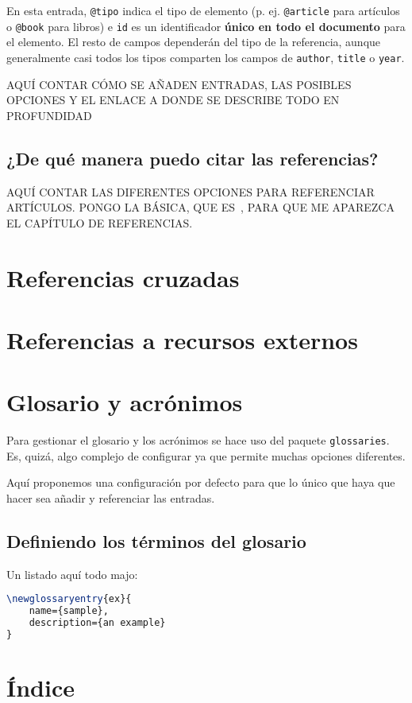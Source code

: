 En esta entrada, \texttt{@tipo} indica el tipo de elemento (p. ej. \texttt{@article} para artículos o \texttt{@book} para libros) e \texttt{id} es un identificador \textbf{único en todo el documento} para el elemento. El resto de campos dependerán del tipo de la referencia, aunque generalmente casi todos los tipos comparten los campos de \texttt{author}, \texttt{title} o \texttt{year}.

AQUÍ CONTAR CÓMO SE AÑADEN ENTRADAS, LAS POSIBLES OPCIONES Y EL ENLACE A DONDE SE DESCRIBE TODO EN PROFUNDIDAD

\subsection{¿De qué manera puedo citar las referencias?}

AQUÍ CONTAR LAS DIFERENTES OPCIONES PARA REFERENCIAR ARTÍCULOS. PONGO LA BÁSICA, QUE ES~\cite{mcculloch1943logical}, PARA QUE ME APAREZCA EL CAPÍTULO DE REFERENCIAS.

\section{Referencias cruzadas}

\section{Referencias a recursos externos}

\section{Glosario y acrónimos}
\label{s:glosario}
Para gestionar el glosario y los acrónimos se hace uso del paquete \texttt{glossaries}. Es, quizá, algo complejo de configurar ya que permite muchas opciones diferentes.

Aquí proponemos una configuración por defecto para que lo único que haya que hacer sea añadir y referenciar las entradas.

\subsection{Definiendo los términos del glosario}

Un listado aquí todo majo:

\begin{lstlisting}[language=TeX]
\newglossaryentry{ex}{
    name={sample},
    description={an example}
}
\end{lstlisting}

\section{Índice}